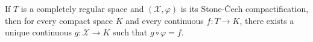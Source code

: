 If $T$ is a completely regular space and $(\mathcal{X}, \varphi)$ is its Stone-Čech compactification, then for every compact space $K$ and every continuous $f: T \to K$, there exists a unique continuous $g: \mathcal{X} \to K$ such that $g \circ \varphi = f$.
